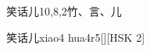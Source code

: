 \begin{entry}{笑话儿}{10,8,2}{⽵、⾔、⼉}
  \begin{phonetics}{笑话儿}{xiao4 hua4r5}[][HSK 2]
  \end{phonetics}
\end{entry}
